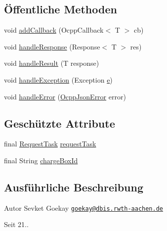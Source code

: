 \subsection*{Öffentliche Methoden}
\begin{DoxyCompactItemize}
\item 
void \hyperlink{classde_1_1rwth_1_1idsg_1_1steve_1_1handler_1_1_abstract_ocpp_response_handler_3_01_t_01_4_a0e9b105abe694aafe78d8823c31876f3}{add\-Callback} (Ocpp\-Callback$<$ T $>$ cb)
\item 
void \hyperlink{classde_1_1rwth_1_1idsg_1_1steve_1_1handler_1_1_abstract_ocpp_response_handler_3_01_t_01_4_a06017636cf97d4a5f1daebe44e940f7e}{handle\-Response} (Response$<$ T $>$ res)
\item 
void \hyperlink{classde_1_1rwth_1_1idsg_1_1steve_1_1handler_1_1_abstract_ocpp_response_handler_3_01_t_01_4_ab326f0759b1ef1fa08895a5f6e1fe3f3}{handle\-Result} (T response)
\item 
void \hyperlink{classde_1_1rwth_1_1idsg_1_1steve_1_1handler_1_1_abstract_ocpp_response_handler_3_01_t_01_4_a171ae542fba4f9da7f5a531263a9d7c8}{handle\-Exception} (Exception \hyperlink{jquery-ui_8min_8js_a2c038346d47955cbe2cb91e338edd7e1}{e})
\item 
void \hyperlink{classde_1_1rwth_1_1idsg_1_1steve_1_1handler_1_1_abstract_ocpp_response_handler_3_01_t_01_4_ace2a08be261a858fb0ee9a29dac0d421}{handle\-Error} (\hyperlink{classde_1_1rwth_1_1idsg_1_1steve_1_1ocpp_1_1ws_1_1data_1_1_ocpp_json_error}{Ocpp\-Json\-Error} error)
\end{DoxyCompactItemize}
\subsection*{Geschützte Attribute}
\begin{DoxyCompactItemize}
\item 
final \hyperlink{classde_1_1rwth_1_1idsg_1_1steve_1_1web_1_1dto_1_1task_1_1_request_task}{Request\-Task} \hyperlink{classde_1_1rwth_1_1idsg_1_1steve_1_1handler_1_1_abstract_ocpp_response_handler_3_01_t_01_4_afbad6820ded6580e25792d7a4b893465}{request\-Task}
\item 
final String \hyperlink{classde_1_1rwth_1_1idsg_1_1steve_1_1handler_1_1_abstract_ocpp_response_handler_3_01_t_01_4_a8c07bdb598803efe236906c96a8d21a6}{charge\-Box\-Id}
\end{DoxyCompactItemize}


\subsection{Ausführliche Beschreibung}
\begin{DoxyAuthor}{Autor}
Sevket Goekay \href{mailto:goekay@dbis.rwth-aachen.de}{\tt goekay@dbis.\-rwth-\/aachen.\-de} 
\end{DoxyAuthor}
\begin{DoxySince}{Seit}
21.. 
\end{DoxySince}


